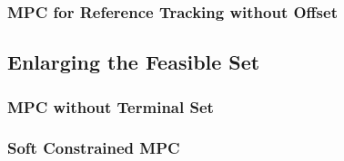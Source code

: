\subsubsection{MPC for Reference Tracking without Offset}





\subsection{Enlarging the Feasible Set}



\subsubsection{MPC without Terminal Set}



\subsubsection{Soft Constrained MPC}





















